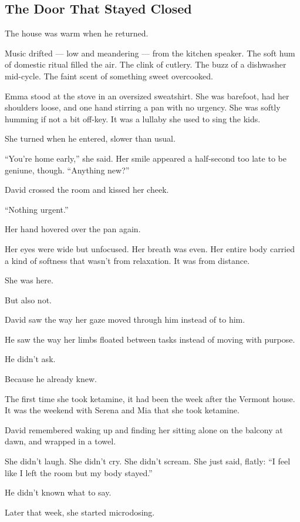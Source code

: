 \subsection{The Door That Stayed Closed}

The house was warm when he returned.

Music drifted --- low and meandering --- from the kitchen speaker.
The soft hum of domestic ritual filled the air.
The clink of cutlery. 
The buzz of a 
dishwasher mid-cycle. 
The faint scent of something sweet overcooked. 

Emma stood at the stove in an oversized sweatshirt. 
She was barefoot, had her shoulders loose, and one hand 
stirring a pan with no urgency. 
She was softly humming if not a bit off-key. It was a lullaby she used to sing the kids.

She turned when he entered, slower than usual.

``You’re home early,'' she said. 
Her smile appeared a half-second too late to be geniune, though. 
``Anything new?''

David crossed the room and kissed her cheek.

``Nothing urgent.''

Her hand hovered over the pan again.

Her eyes were wide but unfocused. 
Her breath was even. 
Her entire body carried a kind of softness that wasn’t from relaxation.
It was from distance. 

She was here.

But also not.

David saw the way her gaze moved through him instead of to him. 

He saw the way her limbs floated between tasks instead of 
moving with purpose.

He didn’t ask.

Because he already knew.

The first time she took ketamine, it had been the week after the Vermont house.
It was the weekend with Serena and Mia that she took ketamine. 

David remembered waking up and finding her sitting alone on the balcony at dawn, 
and wrapped in a towel. 

She didn't laugh. She didn’t cry. She didn’t scream. She just said, flatly:
``I feel like I left the room but my body stayed.''

He didn't known what to say.

Later that week, she started microdosing. 

